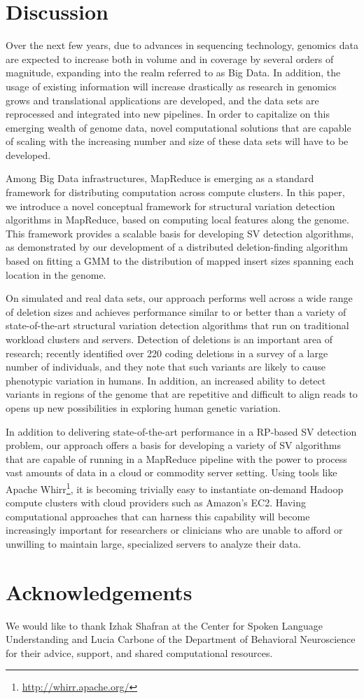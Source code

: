 \documentclass[11pt]{article}
\begin{document}
\section{Discussion}\label{Discussion}

Over the next few years, due to advances in sequencing technology, genomics data are expected to increase both in volume and in coverage by several orders of magnitude, expanding into the realm referred to as Big Data. In addition, the usage of existing information will increase drastically as research in genomics grows and translational applications are developed, and the data sets are reprocessed and integrated into new pipelines. In order to capitalize on this emerging wealth of genome data, novel computational solutions that are capable of scaling with the increasing number and size of these data sets will have to be developed. 

Among Big Data infrastructures, MapReduce is emerging as a standard framework for distributing computation across compute clusters. In this paper, we introduce a novel conceptual framework for structural variation detection algorithms in MapReduce, based on computing local features along the genome. This framework provides a scalable basis for developing SV detection algorithms, as demonstrated by our development of a distributed deletion-finding algorithm based on fitting a GMM to the distribution of mapped insert sizes spanning each location in the genome. 

On simulated and real data sets, our approach performs well across a wide range of deletion sizes and achieves performance similar to or better than a variety of state-of-the-art structural variation detection algorithms that run on traditional workload clusters and servers. Detection of deletions is an important area of research; \textcite{Mills:2011fi} recently identified over 220 coding deletions in a survey of a large number of individuals, and they note that such variants are likely to cause phenotypic variation in humans. In addition, an increased ability to detect variants in regions of the genome that are repetitive and difficult to align reads to opens up new possibilities in exploring human genetic variation.

In addition to delivering state-of-the-art performance in a RP-based SV detection problem, our approach offers a basis for developing a variety of SV algorithms that are capable of running in a MapReduce pipeline with the power to process vast amounts of data in a cloud or commodity server setting. Using tools like Apache Whirr\footnote{\url{http://whirr.apache.org/}}, it is becoming trivially easy to instantiate on-demand Hadoop compute clusters with cloud providers such as Amazon's EC2. Having computational approaches that can harness this capability will become increasingly important for researchers or clinicians who are unable to afford or unwilling to maintain large, specialized servers to analyze their data.

\newpage

\section*{Acknowledgements}

We would like to thank Izhak Shafran at the Center for Spoken Language Understanding and Lucia Carbone of the Department of Behavioral Neuroscience for their advice, support, and shared computational resources.

\printbibliography
\end{document}

